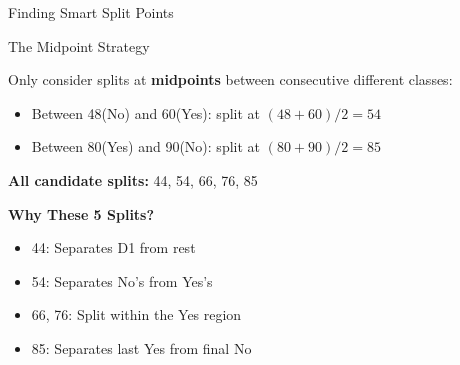 \documentclass[usenames,dvipsnames]{beamer}
\begin{document}
\begin{frame}{Finding Smart Split Points}
\begin{definitionbox}{The Midpoint Strategy}
    \scriptsize

Only consider splits at \textbf{midpoints} between consecutive different classes:
\begin{itemize}
\item Between 48(No) and 60(Yes): split at $(48+60)/2 = 54$
\item Between 80(Yes) and 90(No): split at $(80+90)/2 = 85$
\end{itemize}
\end{definitionbox}

\textbf{All candidate splits:} 44, 54, 66, 76, 85

\begin{keypointsbox}
\textbf{Why These 5 Splits?}
\scriptsize

\begin{itemize}
\item 44: Separates D1 from rest
\item 54: Separates No's from Yes's  
\item 66, 76: Split within the Yes region
\item 85: Separates last Yes from final No
\end{itemize}
\end{keypointsbox}
    \end{frame}
\end{document}
